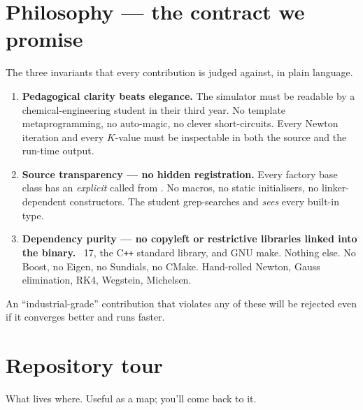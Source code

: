 \documentclass[11pt,a4paper]{article}
\begin{document}
\section{Philosophy --- the contract we promise}\label{sec:phil}

\begin{whatyoulllearn}
The three invariants that every contribution is judged against, in
plain language.
\end{whatyoulllearn}

\begin{enumerate}[leftmargin=*]
  \item \textbf{Pedagogical clarity beats elegance.}
        The simulator must be readable by a chemical-engineering
        student in their third year. No template metaprogramming, no
        auto-magic, no clever short-circuits. Every Newton iteration
        and every $K$-value must be inspectable in both the source and
        the run-time output.

  \item \textbf{Source transparency --- no hidden registration.}
        Every factory base class has an \emph{explicit}
         called from . No
         macros, no static initialisers,
        no linker-dependent constructors. The student grep-searches
         and \emph{sees} every built-in type.

  \item \textbf{Dependency purity --- no copyleft or restrictive libraries linked into the binary.}
        \cpp{}~17, the C\texttt{++} standard library, and GNU make.
        Nothing else. No Boost, no Eigen, no Sundials, no CMake.
        Hand-rolled Newton, Gauss elimination, RK4, Wegstein, Michelsen.
\end{enumerate}

\begin{keyidea}
An ``industrial-grade'' contribution that violates any of these will
be rejected even if it converges better and runs faster.
\end{keyidea}

\section{Repository tour}

\begin{whatyoulllearn}
What lives where. Useful as a map; you'll come back to it.
\end{whatyoulllearn}
\end{document}
